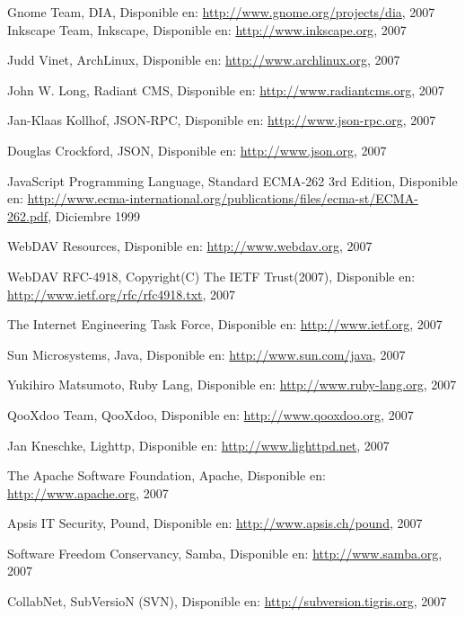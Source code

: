 \begin{thebibliography}{99}

 Gnome Team, DIA, Disponible en: \url{http://www.gnome.org/projects/dia}, 2007
 Inkscape Team, Inkscape, Disponible en:
	\url{http://www.inkscape.org}, 2007

 Judd Vinet, ArchLinux, Disponible en:
	\url{http://www.archlinux.org}, 2007

 John W. Long, Radiant CMS, Disponible en:
	\url{http://www.radiantcms.org}, 2007

 Jan-Klaas Kollhof, JSON-RPC, Disponible en:
	\url{http://www.json-rpc.org}, 2007

Douglas Crockford, JSON, Disponible en:
	\url{http://www.json.org}, 2007

 JavaScript Programming Language, Standard ECMA-262 3rd Edition, Disponible en:
	\url{http://www.ecma-international.org/publications/files/ecma-st/ECMA-262.pdf}, Diciembre 1999

 WebDAV Resources, Disponible en:
	\url{http://www.webdav.org}, 2007

 WebDAV RFC-4918, Copyright(C) The IETF Trust(2007), Disponible en:
	\url{http://www.ietf.org/rfc/rfc4918.txt}, 2007

 The Internet Engineering Task Force, Disponible en:
	\url{http://www.ietf.org}, 2007

 Sun Microsystems, Java, Disponible en:
	\url{http://www.sun.com/java}, 2007

 Yukihiro Matsumoto, Ruby Lang, Disponible en:
	\url{http://www.ruby-lang.org}, 2007

 QooXdoo Team, QooXdoo, Disponible en:	
	\url{http://www.qooxdoo.org}, 2007

 Jan Kneschke, Lighttp, Disponible en:
	\url{http://www.lighttpd.net}, 2007
	
 The Apache Software Foundation, Apache, Disponible en:
	\url{http://www.apache.org}, 2007

 Apsis IT Security, Pound, Disponible en:
	\url{http://www.apsis.ch/pound}, 2007

 Software Freedom Conservancy, Samba, Disponible en:
	\url{http://www.samba.org}, 2007

 CollabNet, SubVersioN (SVN), Disponible en:
	\url{http://subversion.tigris.org}, 2007


\end{thebibliography}
